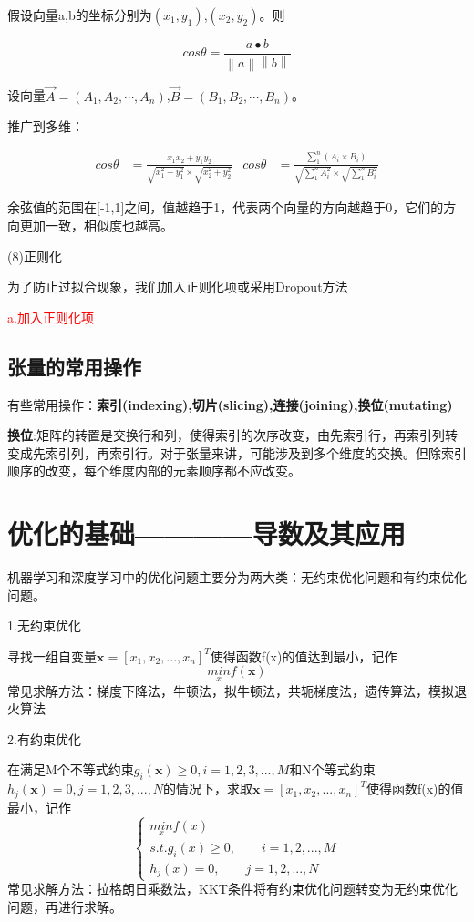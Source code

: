 \documentclass[openbib]{article}
\begin{document}
假设向量a,b的坐标分别为$(x_1,y_1)$,$(x_2,y_2)$。则

$$cos\theta = \frac{a\bullet b}{\left\| a \right\|\left\| b \right\|}$$

设向量$\overrightarrow{A}=\left( A_1,A_2,\cdots ,A_n \right)$,$\overrightarrow{B}=\left( B_1,B_2,\cdots ,B_n \right)$。

推广到多维：

\begin{align*}
	cos\theta &= \frac{x_1x_2+y_1y_2}{\sqrt{x_1^2+y_1^2}\times \sqrt{x_2^2+y_2^2}} & 
	cos\theta &= \frac{\sum_{1}^{n}(A_{i}\times B_{i})}{\sqrt{\sum_{1}^{n}A_{i}^2}\times \sqrt{\sum_{1}^{n}B_{i}^2}}
\end{align*}

余弦值的范围在[-1,1]之间，值越趋于1，代表两个向量的方向越趋于0，它们的方向更加一致，相似度也越高。

(8)正则化

为了防止过拟合现象，我们加入正则化项或采用Dropout方法

\begin{center}
	\textcolor{red}{a.加入正则化项}
\end{center}


\subsection{张量的常用操作}
有些常用操作：\textbf{索引(indexing),切片(slicing),连接(joining),换位(mutating)}

\textbf{换位}:矩阵的转置是交换行和列，使得索引的次序改变，由先索引行，再索引列转变成先索引列，再索引行。对于张量来讲，可能涉及到多个维度的交换。但除索引顺序的改变，每个维度内部的元素顺序都不应改变。
\section{优化的基础————导数及其应用}
机器学习和深度学习中的优化问题主要分为两大类：无约束优化问题和有约束优化问题。
\begin{center}
	1.无约束优化
\end{center}
寻找一组自变量$\textbf{x}=[x_1,x_2,...,x_n]^T$使得函数f(x)的值达到最小，记作$$\underset{x}{min}f(\textbf{x})$$
常见求解方法：梯度下降法，牛顿法，拟牛顿法，共轭梯度法，遗传算法，模拟退火算法
\begin{center}
	2.有约束优化
\end{center}
在满足M个不等式约束$g_i(\textbf{x})\ge0,i=1,2,3,...,M$和N个等式约束$h_j(\textbf{x})=0,j=1,2,3,...,N$的情况下，求取$\textbf{x}=[x_1,x_2,...,x_n]^T$使得函数f(x)的值最小，记作
\[\left\{ \begin{array}{cl}
	\underset{x}{min}f(x) \\
	s.t.g_i(x)\ge 0, \qquad i=1,2,...,M       \\
	h_j(x)=0,\qquad j=1,2,...,N 
\end{array} \right.\]
常见求解方法：拉格朗日乘数法，KKT条件将有约束优化问题转变为无约束优化问题，再进行求解。
\end{document}
